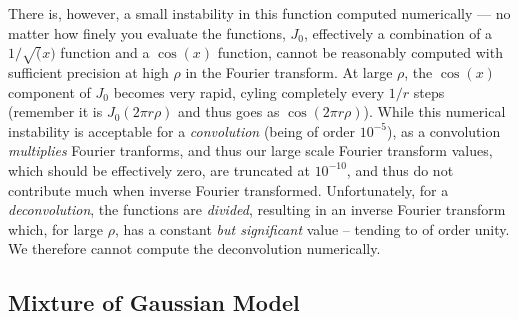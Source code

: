 \documentclass[fleqn,usenatbib]{mnras}
\begin{document}
There is, however, a small instability in this function computed numerically --- no matter how finely you evaluate the functions, $J_0$, effectively a combination of a $1/\sqrt(x)$ function and a $\cos(x)$ function, cannot be reasonably computed with sufficient precision at high $\rho$ in the Fourier transform. At large $\rho$, the $\cos(x)$ component of $J_0$ becomes very rapid, cyling completely every $1/r$ steps (remember it is $J_0(2 \pi r \rho)$ and thus goes as $\cos(2 \pi r \rho)$). While this numerical instability is acceptable for a \textit{convolution} (being of order $10^{-5}$), as a convolution \textit{multiplies} Fourier tranforms, and thus our large scale Fourier transform values, which should be effectively zero, are truncated at $10^{-10}$, and thus do not contribute much when inverse Fourier transformed. Unfortunately, for a \textit{deconvolution}, the functions are \textit{divided}, resulting in an inverse Fourier transform which, for large $\rho$, has a constant \textit{but significant} value -- tending to of order unity. We therefore cannot compute the deconvolution numerically.

\subsection{Mixture of Gaussian Model}







\bsp	%
\label{lastpage}
\end{document}
